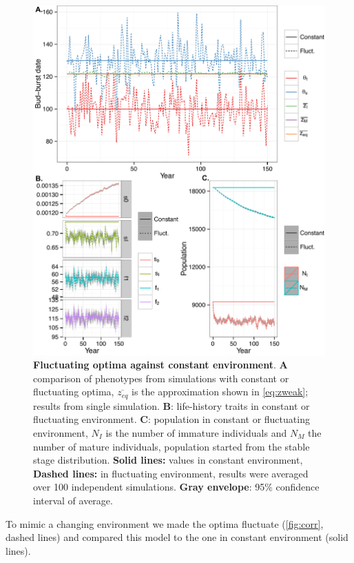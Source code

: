 \begin{figure}[ht!]
	\centering
	\includegraphics[scale=1]{Figures/PhenoLHTwithCorr.pdf}
	\caption{\textbf{Fluctuating optima against constant environment}. \textbf{A} comparison of phenotypes from simulations with constant or fluctuating optima, $\overline{z_{eq}}$ is the approximation shown in \autoref{eq:zweak}; results from single simulation. \textbf{B}: life-history traits in constant or fluctuating environment. \textbf{C}: population in constant or fluctuating environment, $N_I$ is the number of immature individuals and $N_M$ the number of mature individuals, population started from the stable stage distribution. \textbf{Solid lines:} values in constant environment, \textbf{Dashed lines:} in fluctuating environment, results were averaged over 100 independent simulations. \textbf{Gray envelope}: 95\% confidence interval of average.}
	\label{fig:corr}
\end{figure}

To mimic a changing environment we made the optima fluctuate (\autoref{fig:corr}, dashed lines) and compared this model to the one in constant environment (solid lines).

